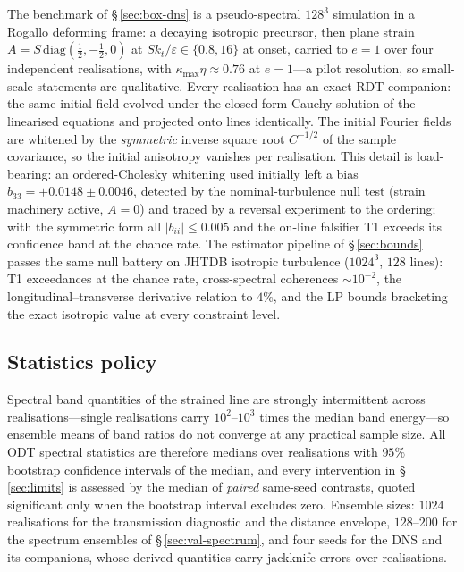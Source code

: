 \documentclass[lineno]{JFM-FLM_Au}
\begin{document}
The benchmark of \S\,\ref{sec:box-dns} is a pseudo-spectral $128^3$
simulation in a Rogallo deforming frame: a decaying isotropic precursor,
then plane strain $A=S\,\mathrm{diag}(\tfrac12,-\tfrac12,0)$ at
$Sk_t/\varepsilon\in\{0.8,16\}$ at onset, carried to $e=1$ over four
independent realisations, with $\kappa_{\max}\eta\approx0.76$ at
$e=1$---a pilot resolution, so small-scale statements are qualitative.
Every realisation has an exact-RDT companion: the same initial field
evolved under the closed-form Cauchy solution of the linearised
equations and projected onto lines identically. The initial Fourier
fields are whitened by the \emph{symmetric} inverse square root
$C^{-1/2}$ of the sample covariance, so the initial anisotropy vanishes
per realisation. This detail is load-bearing: an ordered-Cholesky
whitening used initially left a bias $b_{33}=+0.0148\pm0.0046$,
detected by the nominal-turbulence null test (strain machinery active,
$A=0$) and traced by a reversal experiment to the ordering; with the
symmetric form all $|b_{ii}|\le0.005$ and the on-line falsifier T1
exceeds its confidence band at the chance rate. The estimator pipeline
of \S\,\ref{sec:bounds} passes the same null battery on JHTDB isotropic
turbulence ($1024^3$, $128$ lines): T1 exceedances at the chance rate,
cross-spectral coherences $\sim10^{-2}$, the longitudinal--transverse
derivative relation to $4\%$, and the LP bounds bracketing the exact
isotropic value at every constraint level.

\subsection{Statistics policy}

Spectral band quantities of the strained line are strongly intermittent
across realisations---single realisations carry $10^2$--$10^3$ times
the median band energy---so ensemble means of band ratios do not
converge at any practical sample size. All ODT spectral statistics are
therefore medians over realisations with $95\%$ bootstrap confidence
intervals of the median, and every intervention in
\S\,\ref{sec:limits} is assessed by the median of \emph{paired}
same-seed contrasts, quoted significant only when the bootstrap
interval excludes zero. Ensemble sizes: $1024$ realisations for the
transmission diagnostic and the distance envelope, $128$--$200$ for the
spectrum ensembles of \S\,\ref{sec:val-spectrum}, and four seeds for
the DNS and its companions, whose derived quantities carry jackknife
errors over realisations.




\end{document}
